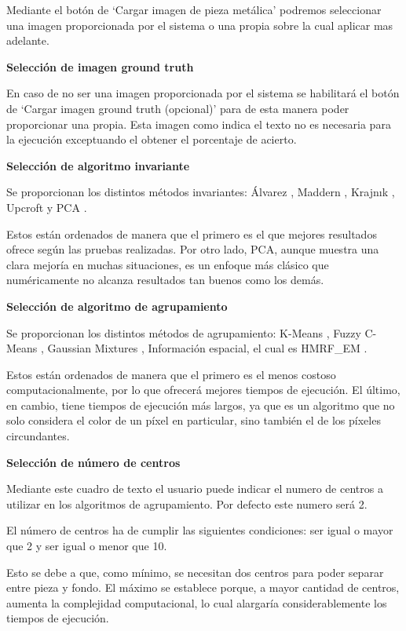Mediante el botón de `Cargar imagen de pieza metálica' podremos seleccionar una imagen proporcionada por el sistema o una propia sobre la cual aplicar mas adelante.

\textbf{Selección de imagen ground truth}\label{selección-de-imagen-ground-truth}

En caso de no ser una imagen proporcionada por el sistema se habilitará el botón de `Cargar imagen ground truth (opcional)' para de esta manera poder proporcionar una propia. Esta imagen como indica el texto no es necesaria para la ejecución exceptuando el obtener el porcentaje de acierto.

\textbf{Selección de algoritmo invariante}\label{selección-de-algoritmo-invariante}

Se proporcionan los distintos métodos invariantes: Álvarez \cite{alvarez2011}, Maddern \cite{maddern2014}, Krajnık \cite{krajník2015}, Upcroft \cite{upcroft2014} y PCA \cite{pca2017}.

Estos están ordenados de manera que el primero es el que mejores resultados ofrece según las pruebas realizadas. Por otro lado, PCA, aunque muestra una clara mejoría en muchas situaciones, es un enfoque más clásico que numéricamente no alcanza resultados tan buenos como los demás.

\textbf{Selección de algoritmo de agrupamiento}\label{selección-de-algoritmo-de-agrupamiento}

Se proporcionan los distintos métodos de agrupamiento: K-Means \cite{MATLAB:2023bKmeans}, Fuzzy C-Means \cite{MATLAB:2023bFuzzy}, Gaussian Mixtures \cite{MATLAB:2023bGMM}, Información espacial, el cual es HMRF\_EM \cite{wang2012hmrf}.

Estos están ordenados de manera que el primero es el menos costoso computacionalmente, por lo que ofrecerá mejores tiempos de ejecución. El último, en cambio, tiene tiempos de ejecución más largos, ya que es un algoritmo que no solo considera el color de un píxel en particular, sino también el de los píxeles circundantes.

\textbf{Selección de número de centros}\label{selección-de-número-de-centros}

Mediante este cuadro de texto el usuario puede indicar el numero de centros a utilizar en los algoritmos de agrupamiento. Por defecto este numero será 2.

El número de centros ha de cumplir las siguientes condiciones: ser igual o mayor que 2 y ser igual o menor que 10.

Esto se debe a que, como mínimo, se necesitan dos centros para poder separar entre pieza y fondo. El máximo se establece porque, a mayor cantidad de centros, aumenta la complejidad computacional, lo cual alargaría considerablemente los tiempos de ejecución.

